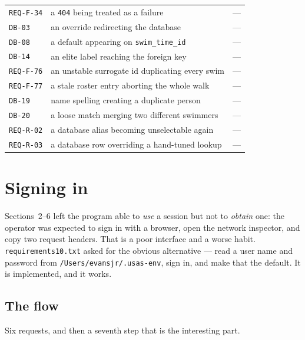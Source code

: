 \documentclass[11pt]{article}
\newcommand{\code}[1]{\texttt{#1}}
\newcommand{\req}[1]{\texttt{#1}}
\begin{document}
\begin{center}
\begin{tabular}{lll}
\req{REQ-F-34} & a \code{404} being treated as a failure              & --- \\
\req{DB-03}    & an override redirecting the database                & --- \\
\req{DB-08}    & a default appearing on \code{swim\_time\_id}        & --- \\
\req{DB-14}    & an elite label reaching the foreign key             & --- \\
\req{REQ-F-76} & an unstable surrogate id duplicating every swim     & --- \\
\req{REQ-F-77} & a stale roster entry aborting the whole walk        & --- \\
\req{DB-19}    & name spelling creating a duplicate person           & --- \\
\req{DB-20}    & a loose match merging two different swimmers        & --- \\
\req{REQ-R-02} & a database alias becoming unselectable again        & --- \\
\req{REQ-R-03} & a database row overriding a hand-tuned lookup       & --- \\
\bottomrule
\end{tabular}
\end{center}

\section{Signing in}\label{sec:signin}

Sections~2--6 left the program able to \emph{use} a session but not to
\emph{obtain} one: the operator was expected to sign in with a browser,
open the network inspector, and copy two request headers.  That is a
poor interface and a worse habit.  \code{requirements10.txt} asked for
the obvious alternative --- read a user name and password from
\code{/Users/evansjr/.usas-env}, sign in, and make that the default.
It is implemented, and it works.

\subsection{The flow}

Six requests, and then a seventh step that is the interesting part.
\end{document}
